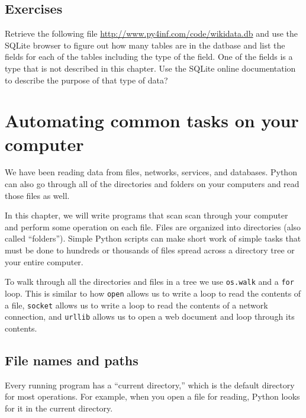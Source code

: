 \documentclass[10pt]{book}
\begin{document}
\section{Exercises}

\begin{ex}
Retrieve the following file \url{http://www.py4inf.com/code/wikidata.db} 
and use the SQLite browser to figure out how many tables
are in the datbase and list the fields for each of the tables including the
type of the field.  One of the fields is a type that is not described in 
this chapter.  Use the SQLite online documentation to describe the
purpose of that type of data?
\end{ex}

\chapter{Automating common tasks on your computer}

We have been reading data from files, networks, services,
and databases.   Python can also go through all of the 
directories and folders on your computers and read those files
as well.

In this chapter, we will write programs that scan 
scan through your computer and 
perform some operation on each file.  
Files are organized into directories (also called ``folders'').
Simple Python scripts
can make short work of simple tasks that must be done to 
hundreds or thousands of files
spread across a directory tree or your entire computer.

To walk through all the directories and files in a tree we use 
{\tt os.walk} and a {\tt for} loop.  This is similar to how 
{\tt open} allows us to write a loop to read the contents of a file,
{\tt socket} allows us to write a loop to read the contents of a network connection, and
{\tt urllib} allows us to open a web document and loop through its contents.

\section{File names and paths}
\label{paths}


Every running program has a ``current directory,'' which is the
default directory for most operations.  
For example, when you open a file for reading, Python looks for it in the
current directory.
\end{document}

